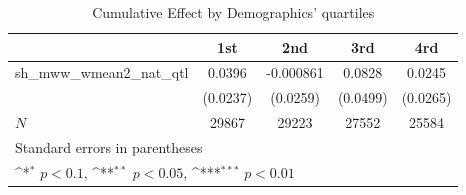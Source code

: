\begin{table}[htbp]\centering
\def\sym#1{\ifmmode^{#1}\else\(^{#1}\)\fi}
\caption{Cumulative Effect by Demographics' quartiles}
\begin{tabular}{l*{4}{c}}
\hline\hline
            &\multicolumn{1}{c}{1st}&\multicolumn{1}{c}{2nd}&\multicolumn{1}{c}{3rd}&\multicolumn{1}{c}{4rd}\\
\hline
sh\_mww\_wmean2\_nat\_qtl&      0.0396         &   -0.000861         &      0.0828         &      0.0245         \\
            &    (0.0237)         &    (0.0259)         &    (0.0499)         &    (0.0265)         \\
\hline
\(N\)       &       29867         &       29223         &       27552         &       25584         \\
\hline\hline
\multicolumn{5}{l}{\footnotesize Standard errors in parentheses}\\
\multicolumn{5}{l}{\footnotesize \sym{*} \(p<0.1\), \sym{**} \(p<0.05\), \sym{***} \(p<0.01\)}\\
\end{tabular}
\end{table}
